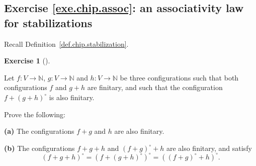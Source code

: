 \documentclass[numbers=enddot,12pt,final,onecolumn,notitlepage]{scrartcl}%
\newcounter{exer}
\theoremstyle{definition}
\newtheorem{exmp}[exer]{Exercise}
\newenvironment{exercise}[1][]
{\begin{exmp}[#1]\begin{leftbar}}
{\end{leftbar}\end{exmp}}
\newcommand{\NN}{\mathbb{N}}
\newcommand{\abs}[1]{\left| #1 \right|}
\newcommand{\tup}[1]{\left( #1 \right)}
\begin{document}
%
%
%

\subsection{Exercise \ref{exe.chip.assoc}: an associativity
law for stabilizations}

Recall Definition~\ref{def.chip.stabilization}.

\begin{exercise} \label{exe.chip.assoc}
Let $f : V \to \NN$, $g : V \to \NN$ and $h : V \to \NN$
be three configurations such that both configurations
$f$ and $g + h$ are finitary, and such that the
configuration $f + \tup{g + h}^\circ$ is also finitary.

Prove the following:

\textbf{(a)} The configurations $f + g$ and $h$ are also
finitary.

\textbf{(b)} The configurations $f + g + h$ and
$\tup{f + g}^\circ + h$ are also finitary, and
satisfy
\[
\tup{f + g + h}^\circ
= \tup{f + \tup{g + h}^\circ}^\circ
= \tup{\tup{f + g}^\circ + h}^\circ .
\]
\end{exercise}
\end{document}
